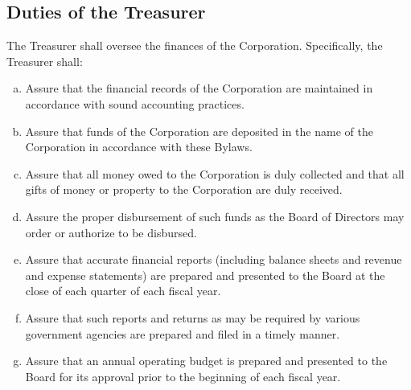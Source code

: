 \subsection{Duties of the Treasurer}
The Treasurer shall oversee the finances of the
Corporation. Specifically, the Treasurer shall:
\begin{enumerate}[a.]
\item Assure that the financial records of the Corporation are
  maintained in accordance with sound accounting practices.
\item Assure that funds of the Corporation are deposited in the name
  of the Corporation in accordance with these Bylaws.
\item Assure that all money owed to the Corporation is duly collected
  and that all gifts of money or property to the Corporation are duly
  received.
\item Assure the proper disbursement of such funds as the Board of
  Directors may order or authorize to be disbursed.
\item Assure that accurate financial reports (including balance sheets
  and revenue and expense statements) are prepared and presented to
  the Board at the close of each quarter of each fiscal year.
\item Assure that such reports and returns as may be required by
  various government agencies are prepared and filed in a timely
  manner.
\item Assure that an annual operating budget is prepared and presented
  to the Board for its approval prior to the beginning of each fiscal
  year.
\end{enumerate}

